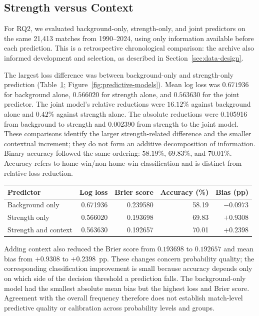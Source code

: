 \subsection{Strength versus Context}
\label{sec:strength-results}

For RQ2, we evaluated background-only, strength-only, and joint predictors on the same 21,413 matches from 1990--2024, using only information available before each prediction. This is a retrospective chronological comparison: the archive also informed development and selection, as described in Section~\ref{sec:data-design}.

The largest loss difference was between background-only and strength-only prediction (Table~\ref{tab:predictive-models}; Figure~\ref{fig:predictive-models}). Mean log loss was $0.671936$ for background alone, $0.566020$ for strength alone, and $0.563630$ for the joint predictor. The joint model's relative reductions were $16.12\%$ against background alone and $0.42\%$ against strength alone. The absolute reductions were 0.105916 from background to strength and 0.002390 from strength to the joint model. These comparisons identify the larger strength-related difference and the smaller contextual increment; they do not form an additive decomposition of information. Binary accuracy followed the same ordering: $58.19\%$, $69.83\%$, and $70.01\%$. Accuracy refers to home-win/non-home-win classification and is distinct from relative loss reduction.

\begin{table}[htbp]
\centering\small
{}
\label{tab:predictive-models}
\begin{tabular}{lrrrr}
\toprule
Predictor & Log loss & Brier score & Accuracy (\%) & Bias (pp) \\
\midrule
Background only & 0.671936 & 0.239580 & 58.19 & $-0.0973$ \\
Strength only & 0.566020 & 0.193698 & 69.83 & $+0.9308$ \\
Strength and context & 0.563630 & 0.192657 & 70.01 & $+0.2398$ \\
\bottomrule
\end{tabular}
\end{table}

Adding context also reduced the Brier score from $0.193698$ to $0.192657$ and mean bias from $+0.9308$ to $+0.2398$~pp. These changes concern probability quality; the corresponding classification improvement is small because accuracy depends only on which side of the decision threshold a prediction falls. The background-only model had the smallest absolute mean bias but the highest loss and Brier score. Agreement with the overall frequency therefore does not establish match-level predictive quality or calibration across probability levels and groups.

